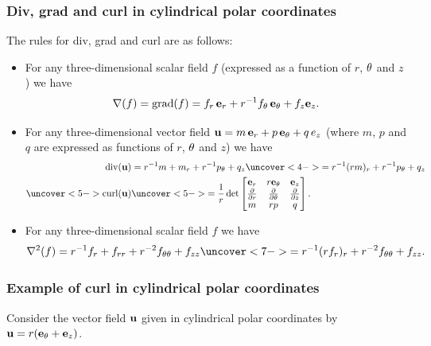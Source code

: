 \documentclass[9pt]{beamer}
\begin{document}
\begin{frame}[t]
 \frametitle{Div, grad and curl in cylindrical polar coordinates}

 The rules for div, grad and curl are as follows:
 \begin{itemize}
  \item<2->[(a)] For any three-dimensional scalar field $f$ (expressed as a
   function of $r$, $\theta$ and $z$) we have 
   \[ \nabla(f) = \operatorname{grad}(f) = f_r\,\mathbf{e}_r + r^{-1}f_\theta\,\mathbf{e}_\theta + f_z\mathbf{e}_z. \]
  \item<3->[(b)] For any three-dimensional vector field
   $\mathbf{u}=m\,\mathbf{e}_r+p\,\mathbf{e}_\theta+q\,e_z$ (where $m$, $p$ and $q$ are expressed as
   functions of $r$, $\theta$ and $z$) we have 
   \begin{align*}
    \dv(\vu)
     &= r^{-1}m + m_r + r^{-1}p_\tht + q_z 
      \uc<4->{= r^{-1}(rm)_r + r^{-1}p_\tht + q_z} \\
    \uc<5->{\curl(\vu)}
     &\uc<5->{= \frac{1}{r} \det\bbm
          \ve_r & r\ve_\tht & \ve_z \\
          \ddr  & \ddt      & \ddz  \\
          m     & rp        & q \ebm.}
   \end{align*}
  \item<6->[(c)] For any three-dimensional scalar field $f$ we have 
   \[ \nabla^2(f) = r^{-1}f_r + f_{rr} + r^{-2}f_{\tht\tht} + f_{zz}
        \uc<7->{= r^{-1}(rf_r)_r + r^{-2}f_{\tht\tht} + f_{zz}.}
   \]
 \end{itemize}
\end{frame}


\begin{frame}[t]
 \frametitle{Example of curl in cylindrical polar coordinates}

 Consider the vector field $\mathbf{u}$ given in cylindrical polar
 coordinates by $\mathbf{u}=r(\mathbf{e}_\theta+\mathbf{e}_z)$.  
\end{frame}
\end{document}

